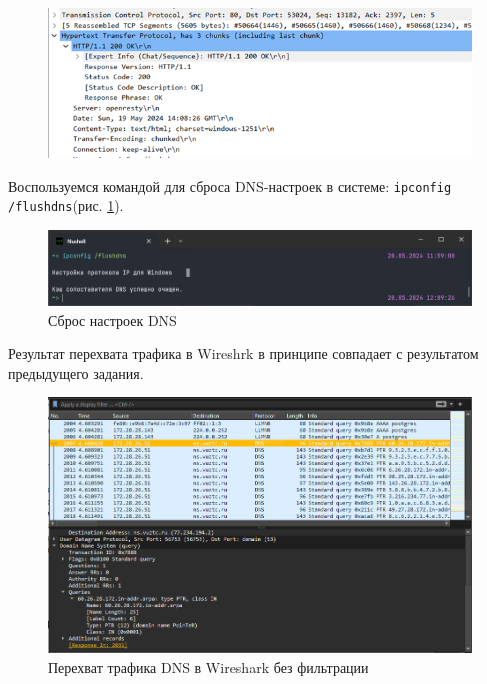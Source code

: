 \begin{figure}[H]
    \centering
    \includegraphics[width=1\linewidth]{res/http-no-tls-2.png}
\end{figure}


Воспользуемся командой для сброса DNS-настроек в системе: \verb|ipconfig /flushdns|\;(рис. \ref{fig:dns-shell}).

\begin{figure}[h]
    \centering
    \includegraphics[width=1\linewidth]{res/dns-shell.png}
    \caption{Сброс настроек DNS}
    \label{fig:dns-shell}
\end{figure}

Результат перехвата трафика в Wireshrk в принципе совпадает с результатом предыдущего задания.

\begin{figure}
    \centering
    \includegraphics[width=1\linewidth]{res/dns-wireshark-no-filter.png}
    \caption{Перехват трафика DNS в Wireshark без фильтрации}
    \label{fig:dns-wireshark}
\end{figure}

